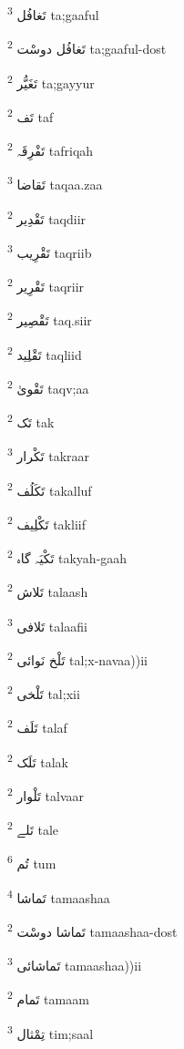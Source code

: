 \documentclass[12pt]{article}
\begin{document}
\begin{multicols}{5}
{\ur تَغافُل}   \textsuperscript{3} ta;gaaful

{\ur تَغافُل دوسْت}   \textsuperscript{2} ta;gaaful-dost

{\ur تَغَیُّر}   \textsuperscript{2} ta;gayyur

{\ur تَف}   \textsuperscript{2} taf

{\ur تَفْرِقَہ}   \textsuperscript{2} tafriqah

{\ur تَقاضا}   \textsuperscript{3} taqaa.zaa

{\ur تَقْدِیر}   \textsuperscript{2} taqdiir

{\ur تَقْرِیب}   \textsuperscript{3} taqriib

{\ur تَقْرِیر}   \textsuperscript{2} taqriir

{\ur تَقْصِیر}   \textsuperscript{2} taq.siir

{\ur تَقْلِید}   \textsuperscript{2} taqliid

{\ur تَقْویٰ}   \textsuperscript{2} taqv;aa

{\ur تَک}   \textsuperscript{2} tak

{\ur تَکْرار}   \textsuperscript{3} takraar

{\ur تَکَلُف}   \textsuperscript{2} takalluf

{\ur تَکْلِیف}   \textsuperscript{2} takliif

{\ur تَکْیَہ گاہ}   \textsuperscript{2} takyah-gaah

{\ur تَلاش}   \textsuperscript{2} talaash

{\ur تَلافی}   \textsuperscript{3} talaafii

{\ur تَلْخ نَوائی}   \textsuperscript{2} tal;x-navaa))ii

{\ur تَلْخی}   \textsuperscript{2} tal;xii

{\ur تَلَف}   \textsuperscript{2} talaf

{\ur تَلَک}   \textsuperscript{2} talak

{\ur تَلْوار}   \textsuperscript{2} talvaar

{\ur تَلے}   \textsuperscript{2} tale

{\ur تُم}   \textsuperscript{6} tum

{\ur تَماشا}   \textsuperscript{4} tamaashaa

{\ur تَماشا دوسْت}   \textsuperscript{2} tamaashaa-dost

{\ur تَماشائی}   \textsuperscript{3} tamaashaa))ii

{\ur تَمام}   \textsuperscript{2} tamaam

{\ur تِمْثال}   \textsuperscript{3} tim;saal


\end{multicols}
\end{document}
